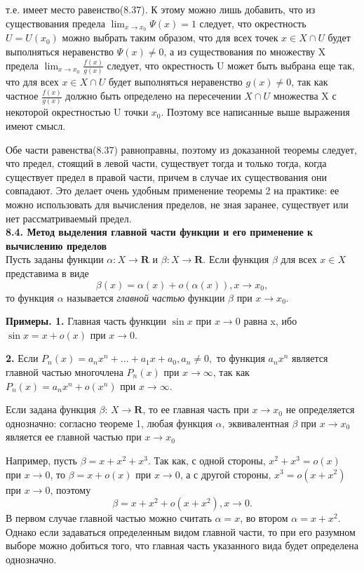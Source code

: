 \documentclass[a4paper, 12pt]{article}
\begin{document}
\begin{justifying}

\noindent т.е. имеет место равенство(8.37). К этому можно лишь добавить, что из существования предела $\lim_{x\to x_{0}} \Psi(x)=1$ следует, что окрестность $U = U{(x_{0})}$ можно выбрать таким образом, что для всех точек $x \in X \cap U$ будет выполняться неравенство $\Psi(x) \ne 0$, а из существования по множеству X предела  $\lim_{x\to x_{0}}\frac{f(x)}{g(x)}$ следует, что окрестность U может быть выбрана еще так, что для всех $x \in X \cap U$ будет выполняться неравенство $g(x) \ne 0$, так как частное $\frac{f(x)}{g(x)}$ должно быть определено на пересечении $X \cap U$ множества X с некоторой окрестностью U точки $x_{0}$. Поэтому все написанные выше выражения имеют смысл.

Обе части равенства(8.37) равноправны, поэтому из доказанной теоремы следует, что предел, стоящий в левой части, существует тогда и только тогда, когда существует предел в правой части, причем в случае их существования они совпадают. Это делает очень удобным применение теоремы 2 на практике: ее можно использовать для вычисления пределов, не зная заранее, существует или нет рассматриваемый предел.\\

\noindent \textbf{8.4. Метод выделения главной части функции \newline и его применение к вычислению пределов}\\ 
\newline Пусть заданы функции $\alpha: X \to \mathbf{R}$ и $\beta: X \to \mathbf{R}$. Если функция $\beta$ для всех $x \in X$ представима в виде \[\beta(x) = \alpha(x) + o(\alpha(x)), x \to x_{0},\] то функция $\alpha$ называется \textsl{главной частью} функции $\beta$ при $x \to x_{0}$.

\textbf{Примеры. 1.} Главная часть функции $\sin x$ при $x \to 0$ равна x, ибо $\sin x = x + o(x)$ при $x \to 0$.

\textbf{2.} Если $P_{n}(x) = a_{n}x^{n} + ... + a_{1}x + a_{0}, a_{n} \ne 0,$ то функция $a_{n}x^{n}$ является главной частью многочлена $P_{n}(x)$ при $x \to \infty$, так как $P_{n}(x) = a_{n}x^{n} + o(x^{n})$ при $x \to \infty$.\newpage

Если задана функция $\beta$: $X \to \mathbf{R}$, то ее главная часть при $x \to x_{0}$ не определяется однозначно: согласно теореме 1, любая функция $\alpha$, эквивалентная $\beta$ при $x \to x_{0}$ является ее главной частью при $x \to x_{0}$

Например, пусть $\beta = x + x^{2} + x^{3}$. Так как, с одной стороны, $x^{2} + x^{3} = o(x)$ при $x \to 0$, то $\beta = x + o(x)$ при $x \to 0$, а с другой стороны, $x^{3} = o(x + x^{2})$ при $x \to 0$, поэтому \[\beta = x + x^{2} + o(x + x^{2}),  x \to 0.\] В первом случае главной частью можно считать $\alpha = x$, во втором $\alpha = x + x^{2}$. Однако если задаваться определенным видом главной части, то при его разумном выборе можно добиться того, что главная часть указанного вида будет определена однозначно.


\end{justifying}
\end{document}
